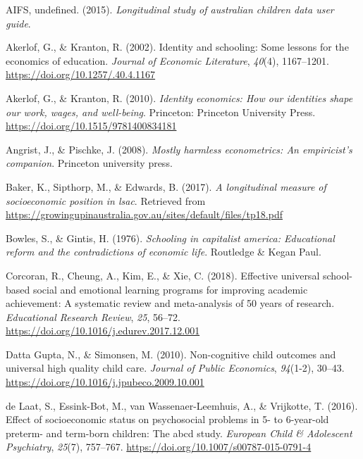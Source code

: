 \documentclass[
  english,
  man]{apa6}
\newlength{\cslhangindent}
\newenvironment{cslreferences}%
  {\setlength{\parindent}{0pt}%
  \everypar{\setlength{\hangindent}{\cslhangindent}}\ignorespaces}%
  {\par}
\begin{document}
\hypertarget{refs}{}
\begin{cslreferences}
\leavevmode\hypertarget{ref-aifs2015}{}%
AIFS, undefined. (2015). \emph{Longitudinal study of australian children data user guide}.

\leavevmode\hypertarget{ref-akerlof2002}{}%
Akerlof, G., \& Kranton, R. (2002). Identity and schooling: Some lessons for the economics of education. \emph{Journal of Economic Literature}, \emph{40}(4), 1167--1201. \url{https://doi.org/10.1257/.40.4.1167}

\leavevmode\hypertarget{ref-akerlof2010}{}%
Akerlof, G., \& Kranton, R. (2010). \emph{Identity economics: How our identities shape our work, wages, and well-being}. Princeton: Princeton University Press. \url{https://doi.org/10.1515/9781400834181}

\leavevmode\hypertarget{ref-angrist2008}{}%
Angrist, J., \& Pischke, J. (2008). \emph{Mostly harmless econometrics: An empiricist's companion}. Princeton university press.

\leavevmode\hypertarget{ref-baker2017}{}%
Baker, K., Sipthorp, M., \& Edwards, B. (2017). \emph{A longitudinal measure of socioeconomic position in lsac}. Retrieved from \url{https://growingupinaustralia.gov.au/sites/default/files/tp18.pdf}

\leavevmode\hypertarget{ref-bowles1976}{}%
Bowles, S., \& Gintis, H. (1976). \emph{Schooling in capitalist america: Educational reform and the contradictions of economic life}. Routledge \& Kegan Paul.

\leavevmode\hypertarget{ref-corcoran2018}{}%
Corcoran, R., Cheung, A., Kim, E., \& Xie, C. (2018). Effective universal school-based social and emotional learning programs for improving academic achievement: A systematic review and meta-analysis of 50 years of research. \emph{Educational Research Review}, \emph{25}, 56--72. \url{https://doi.org/10.1016/j.edurev.2017.12.001}

\leavevmode\hypertarget{ref-dattagupta2010}{}%
Datta Gupta, N., \& Simonsen, M. (2010). Non-cognitive child outcomes and universal high quality child care. \emph{Journal of Public Economics}, \emph{94}(1-2), 30--43. \url{https://doi.org/10.1016/j.jpubeco.2009.10.001}

\leavevmode\hypertarget{ref-delaat2016}{}%
de Laat, S., Essink-Bot, M., van Wassenaer-Leemhuis, A., \& Vrijkotte, T. (2016). Effect of socioeconomic status on psychosocial problems in 5- to 6-year-old preterm- and term-born children: The abcd study. \emph{European Child \& Adolescent Psychiatry}, \emph{25}(7), 757--767. \url{https://doi.org/10.1007/s00787-015-0791-4}


\end{cslreferences}
\end{document}
